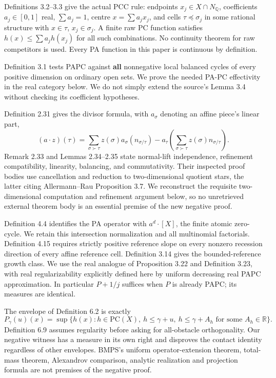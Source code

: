 \documentclass[
  11pt,
]{article}
\begin{document}
Definitions 3.2--3.3 give the actual PCC rule: endpoints
\(x_j\in X\cap N_{\mathbb Q}\), coefficients \(a_j\in[0,1]\) real,
\(\sum a_j=1\), centre \(x=\sum a_jx_j\), and cells
\(\tau\preceq\sigma_j\) in some rational structure with \(x\in\tau\),
\(x_j\in\sigma_j\). A finite raw PC function satisfies
\(h(x)\leq\sum a_jh(x_j)\) for all such combinations. No continuity
theorem for raw competitors is used. Every PA function in this paper is
continuous by definition.

Definition 3.1 tests PAPC against \textbf{all} nonnegative local
balanced cycles of every positive dimension on ordinary open sets. We
prove the needed PA-PC effectivity in the real category below. We do not
simply extend the source's Lemma 3.4 without checking its coefficient
hypotheses.

Definition 2.31 gives the divisor formula, with \(a_\sigma\) denoting an
affine piece's linear part, \[
(a\cdot z)(\tau)=\sum_{\sigma\succ\tau}z(\sigma)a_\sigma(n_{\sigma/\tau})
-a_\tau\left(\sum_{\sigma\succ\tau}z(\sigma)n_{\sigma/\tau}\right).
\tag{D}
\] Remark 2.33 and Lemmas 2.34--2.35 state normal-lift independence,
refinement compatibility, linearity, balancing, and commutativity. Their
inspected proof bodies use cancellation and reduction to two-dimensional
quotient stars, the latter citing Allermann--Rau Proposition 3.7. We
reconstruct the requisite two-dimensional computation and refinement
argument below, so no unretrieved external theorem body is an essential
premise of the new negative proof.

Definition 4.4 identifies the PA operator with \(a^d\cdot[X]\), the
finite atomic zero-cycle. We retain this intersection normalization and
all multinomial factorials. Definition 4.15 requires strictly positive
reference slope on every nonzero recession direction of every affine
reference cell. Definition 3.14 gives the bounded-reference growth
class. We use the real analogue of Proposition 3.22 and Definition
3.23, with real regularizability explicitly defined here by uniform
decreasing real PAPC approximation. In
particular \(P+1/j\) suffices when \(P\) is already PAPC; its measures
are identical.

The envelope of Definition 6.2 is exactly \[
P_\gamma(u)(x)=\sup\{h(x):h\in\mathrm{PC}(X),\ h\leq\gamma+u,
\ h\leq\gamma+A_h\text{ for some }A_h\in\mathbb R\}.
\tag{E}
\] Definition 6.9 assumes regularity before asking for all-obstacle
orthogonality. Our negative witness has a measure in its own right and
disproves the contact identity regardless of other envelopes. BMPS's
uniform operator-extension theorem, total-mass theorem, Alexandrov
comparison, analytic realization and projection formula are not premises
of the negative proof.
\end{document}
